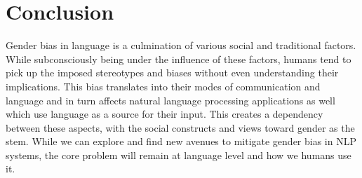 \documentclass{article}
\begin{document}
\section*{Conclusion}
Gender bias in language is a culmination of various social and traditional factors. While subconsciously being under the influence of these factors, humans tend to pick up the imposed stereotypes and biases without even understanding their implications. This bias translates into their modes of communication and language and in turn affects natural language processing applications as well which use language as a source for their input. This creates a dependency between these aspects, with the social constructs and views toward gender as the stem. While we can explore and find new avenues to mitigate gender bias in NLP systems, the core problem will remain at language level and how we humans use it. 

\clearpage


\end{document}
